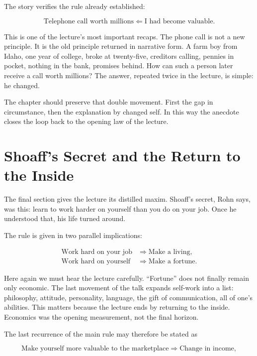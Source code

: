 The story verifies the rule already established:

\begin{equation}
\text{Telephone call worth millions} \Longleftarrow \text{I had become valuable}.
\end{equation}

This is one of the lecture's most important recaps. The phone call is not a new principle. It is the old principle returned in narrative form. A farm boy from Idaho, one year of college, broke at twenty-five, creditors calling, pennies in pocket, nothing in the bank, promises behind. How can such a person later receive a call worth millions? The answer, repeated twice in the lecture, is simple: he changed.

The chapter should preserve that double movement. First the gap in circumstance, then the explanation by changed self. In this way the anecdote closes the loop back to the opening law of the lecture.

\section{Shoaff's Secret and the Return to the Inside}

The final section gives the lecture its distilled maxim. Shoaff's secret, Rohn says, was this: learn to work harder on yourself than you do on your job. Once he understood that, his life turned around.

The rule is given in two parallel implications:

\begin{align}
\text{Work hard on your job} &\Longrightarrow \text{Make a living},\\
\text{Work hard on yourself} &\Longrightarrow \text{Make a fortune}.
\end{align}

Here again we must hear the lecture carefully. “Fortune” does not finally remain only economic. The last movement of the talk expands self-work into a list: philosophy, attitude, personality, language, the gift of communication, all of one's abilities. This matters because the lecture ends by returning to the inside. Economics was the opening measurement, not the final horizon.

The last recurrence of the main rule may therefore be stated as

\begin{equation}
\text{Make yourself more valuable to the marketplace} \Longrightarrow \text{Change in income},
\end{equation}

